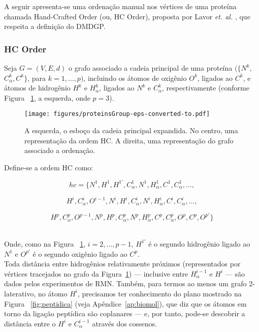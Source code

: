 A seguir apresenta-se uma ordenação manual nos vértices de uma proteína chamada Hand-Crafted Order (ou, HC Order), proposta por Lavor \textit{et. al.} \cite{carlile:MinimalOrder}, que respeita a definição do DMDGP.

\subsubsection*{HC Order\label{sec:hc}}
Seja $G = (V, E, d)$ o grafo associado a cadeia principal de uma proteína $(\{N^k,\ $ $ C^{k}_\alpha,C^k\}$, para $k = 1,\dots,p)$, incluindo os átomos de oxigênio $O^k$, ligados ao $C^k$, e átomos de hidrogênio $H^k$ e $H^{k}_\alpha$, ligados ao $N^k$ e $C^{k}_\alpha$, respectivamente (conforme Figura ~\ref{fig:hcVO}, a esquerda, onde $p = 3$).

\begin{figure}[H]
	\begin{center}
		\texttt{[image: figures/proteinsGroup-eps-converted-to.pdf]}
	\end{center}
	\caption{A esquerda, o esboço da cadeia principal expandida. No centro, uma representação da ordem HC. A direita, uma representação do grafo associado a ordenação.}
	\label{fig:hcVO}
\end{figure}

Define-se a ordem HC como:

\begin{minipage}{0.532\linewidth}
	$$
	hc = \{ N^1, H^1, H^{1'}, C_{\alpha}^1, N^1, H_{\alpha}^1, C^1, C_{\alpha}^1, \dots,
	$$
	
\end{minipage}
$$
H^i, C_{\alpha}^i, O^{i-1}, N^i, H^i, C^{i}_\alpha, N^i, H^{i}_\alpha, C^i, C_{\alpha}^i,\dots,
$$

\hspace{4.5cm}
\begin{minipage}{0.532\linewidth}
	\vspace{-0.7cm}
	$$
	H^p, C_{\alpha}^p, O^{p-1}, N^p, H^p, C^{p}_\alpha, N^p, H^{p}_\alpha, C^p, C_{\alpha}^p, O^p, C^p, O^{p'}\}
	$$
\end{minipage}
\\

Onde, como na Figura ~\ref{fig:hcVO}, $i = 2, \dots, p-1$, $H^{1'}$ é o segundo hidrogênio ligado ao $N^1$ e $O^{p'}$ é o segundo oxigênio ligado ao $C^p$.	
\\


Toda distância entre hidrogênios relativamente próximos (representados por vértices tracejados no grafo da Figura~\ref{fig:hcVO}) --- inclusive entre $H_\alpha^{i-1}$ e $H^{i}$ --- são dados pelos experimentos de RMN. Também, para termos ao menos um grafo 2-laterativo, no átomo $H^i$, precisamos ter conhecimento do plano mostrado na Figura ~\ref{fig:peptidica} (veja Apêndice~\ref{ap:biomol}), que diz que os átomos em torno da ligação peptídica são coplanares --- e, por tanto, pode-se descobrir a distância entre o $H^i$ e $C_\alpha^{i-1}$ através dos cossenos.
\\

